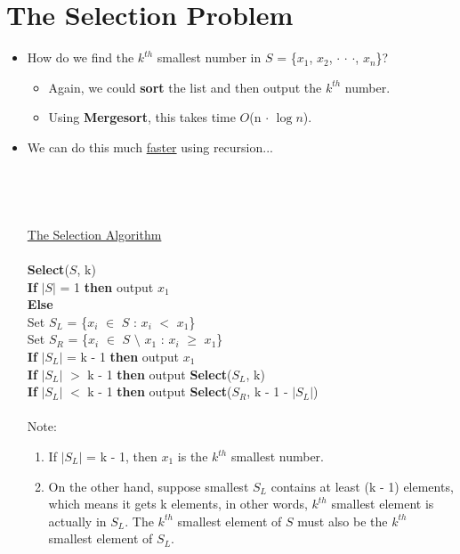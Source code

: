 \documentclass[12pt]{article}
\newcommand{\forceindent}{\leavevmode{\parindent=1em\indent}}
\begin{document}
\section{The Selection Problem}
\renewcommand{\labelitemii}{$\circ$}
\renewcommand{\labelitemiii}{$\cdot$}
\renewcommand{\labelitemiii}{$\rightarrow$}
\begin{itemize}
\item How do we find the $k^{th}$ smallest number in {\large$S$ = \{$x_1$, $x_2$, $\cdot$ $\cdot$ $\cdot$, $x_n$\}}?
	\begin{itemize}
	\item Again, we could \textbf{sort} the list and then output the $k^{th}$ number.
	\item Using \textbf{Mergesort}, this takes time $O$(n $\cdot$ $\log{}n$).
	\end{itemize}
\item We can do this much \underline{faster} using recursion...\\
\\
\\
\\
\\
{\large
\underline{The Selection Algorithm}\\
\\
\textbf{Select}($S$, k)\\
\textbf{If} $|S|$ = 1 \textbf{then} output $x_1$\\
\textbf{Else}\\
\forceindent Set $S_L$ = \{$x_i$ $\in$ $S$ : $x_i$ $<$ $x_1$\}\\
\forceindent Set $S_R$ = \{$x_i$ $\in$ $S$ $\setminus$ $x_1$ : $x_i$ $\geq$ $x_1$\}\\
\forceindent \textbf{If} $|S_L|$ = k - 1 \textbf{then} output $x_1$\\
\forceindent \textbf{If} $|S_L|$ $>$ k - 1 \textbf{then} output \textbf{Select}($S_L$, k)\\
\forceindent \textbf{If} $|S_L|$ $<$ k - 1 \textbf{then} output \textbf{Select}($S_R$, k - 1 - $|S_L|$)}\\
\\
Note: 
\begin{enumerate}
\item If $|S_L|$ = k - 1, then $x_1$ is the $k^{th}$ smallest number. 
\item On the other hand, suppose smallest $S_L$ contains at least (k - 1) elements, which means it gets k elements, in other words, $k^{th}$ smallest element is actually in $S_L$. The $k^{th}$ smallest element of $S$ must also be the $k^{th}$ smallest element of $S_L$.

\end{enumerate}
\end{itemize}
\end{document}

